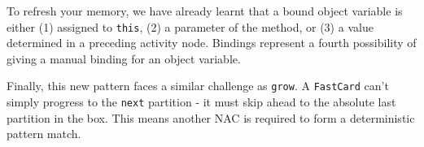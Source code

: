 To refresh your memory, we have already learnt that a bound object variable is either (1) assigned to \texttt{this}, (2) a parameter of the method, or (3) a
value determined in a preceding activity node. Bindings represent a fourth possibility of giving a manual binding for an object variable.

Finally, this new pattern faces a similar challenge as \texttt{grow}. A \texttt{FastCard} can't simply progress to the \texttt{next} partition - it
must skip ahead to the absolute last partition in the box. This means another NAC is required to form a deterministic pattern match.

  



